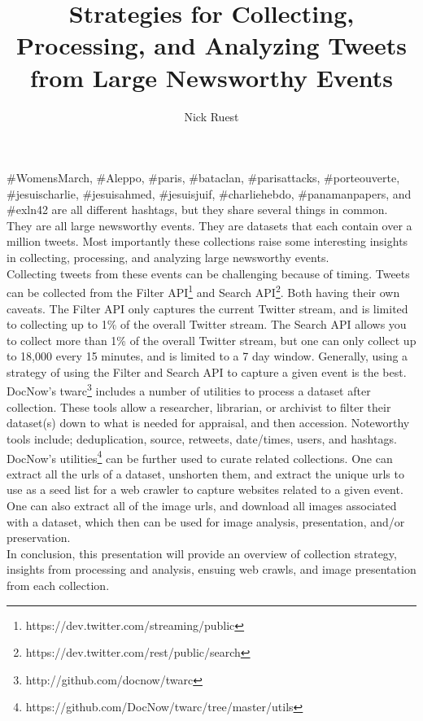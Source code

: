 \documentclass[sigconf]{acmart}
\begin{document}
\title{Strategies for Collecting, Processing, and Analyzing Tweets from Large Newsworthy Events}

\author{Nick Ruest}



\maketitle

\#WomensMarch, \#Aleppo, \#paris, \#bataclan, \#parisattacks, \#porteouverte, \#jesuischarlie, \#jesuisahmed, \#jesuisjuif, \#charliehebdo, \#panamanpapers, and \#exln42 are all different hashtags, but they share several things in common. They are all large newsworthy events. They are datasets that each contain over a million tweets. Most importantly these collections raise some interesting insights in collecting, processing, and analyzing large newsworthy events\cite{Milligan_etal_JCDL2016}.\\
 
Collecting tweets from these events can be challenging because of timing. Tweets can be collected from the Filter API\footnote{https://dev.twitter.com/streaming/public} and Search API\footnote{https://dev.twitter.com/rest/public/search}. Both having their own caveats. The Filter API only captures the current Twitter stream, and is limited to collecting up to 1\% of the overall Twitter stream. The Search API allows you to collect more than 1\% of the overall Twitter stream\cite{Driscoll_etal_IJC2014}, but one can only collect up to 18,000 every 15 minutes, and is limited to a 7 day window. Generally, using a strategy of using the Filter and Search API to capture a given event is the best.\\
 
DocNow's twarc\footnote{http://github.com/docnow/twarc} includes a number of utilities to process a dataset after collection. These tools allow a researcher, librarian, or archivist to filter their dataset(s) down to what is needed for appraisal, and then accession. Noteworthy tools include; deduplication, source, retweets, date/times, users, and hashtags.\\
 
DocNow's utilities\footnote{https://github.com/DocNow/twarc/tree/master/utils} can be further used to curate related collections. One can extract all the urls of a dataset, unshorten them, and extract the unique urls to use as a seed list for a web crawler to capture websites related to a given event. One can also extract all of the image urls, and download all images associated with a dataset, which then can be used for image analysis\cite{ruest_2016}, presentation, and/or preservation.\\
 
In conclusion, this presentation will provide an overview of collection strategy, insights from processing and analysis, ensuing web crawls, and image presentation from each collection.\\


 
\end{document}
